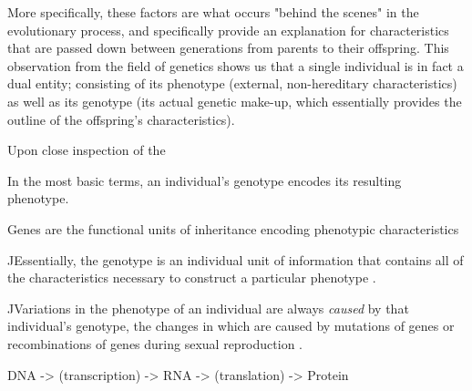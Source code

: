 More specifically, these factors are what occurs "behind the scenes" in the evolutionary process, and specifically provide an explanation for characteristics that are passed down between generations from parents to their offspring. 
This observation from the field of genetics shows us that a single individual is in fact a dual entity; consisting of its phenotype (external, non-hereditary characteristics) as well as its genotype (its actual genetic make-up, which essentially provides the outline of the offspring's characteristics).

Upon close inspection of the 

In the most basic terms, an individual's genotype encodes its resulting phenotype.

Genes are the functional units of inheritance encoding phenotypic characteristics


^^
Essentially, the genotype is an individual unit of information that contains all of the characteristics necessary to construct a particular phenotype \cite{EibenSmith2003}.


^^
Variations in the phenotype of an individual are always \textit{caused} by that individual's genotype, the changes in which are caused by mutations of genes or recombinations of genes during sexual reproduction \cite{EibenSmith2003}.

DNA -> (transcription) -> RNA -> (translation) -> Protein



